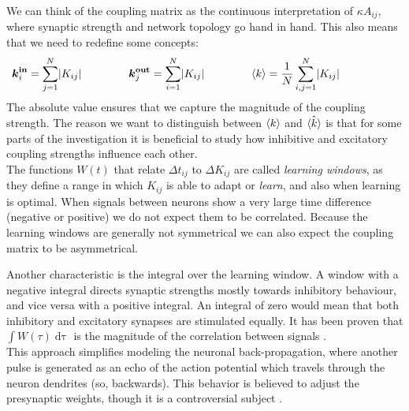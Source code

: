 We can think of the coupling matrix as the continuous interpretation of $\kappa A_{ij}$, where synaptic strength and network topology go hand in hand. This also means that we need to redefine some concepts:
\begin{align}
\kinbi = \sum_{j=1}^{N} \rvert K_{i j} \rvert \hspace{15mm} 
\koutbj = \sum_{i=1}^{N} \rvert K_{i j} \rvert \hspace{15mm} 
\kmean &= \frac{1}{N} \sum_{i,j=1}^{N} \rvert K_{i j} \rvert \hspace{15mm}  \label{eq:redefineFromK}  %
\end{align}
The absolute value ensures that we capture the magnitude of the coupling strength. The reason we want to distinguish between ${\langle k\rangle}$ and $\hat{{\langle k\rangle}}$ is that for some parts of the investigation it is beneficial to study how inhibitive and excitatory coupling strengths influence each other.\\

The functions $W(t)$ that relate $\Delta t_{ij}$ to $\Delta K_{ij}$ are called \textsl{learning windows},  as they define a range in which $K_{ij}$ is able to adapt or \textsl{learn}, and also when learning is optimal. When signals between neurons show a very large time difference (negative or positive) we do not expect them to be correlated. Because the learning windows are generally not symmetrical we can also expect the coupling matrix to be asymmetrical.

Another characteristic is the integral over the learning window. A window with a negative integral directs synaptic strengths mostly towards inhibitory behaviour, and vice versa with a positive integral. An integral of zero would mean that both inhibitory and excitatory synapses are stimulated equally. It has been proven that $\int W(\tau) \mathop{d\tau}$ is the magnitude of the correlation between signals \cite{Gerstner2002}. \\


This approach simplifies modeling the neuronal back-propagation, where another pulse is generated as an echo of the action potential which travels through the neuron dendrites (so, backwards). This behavior is believed to adjust the presynaptic weights, though it is a controversial subject \cite{Gerstner2002}. 


